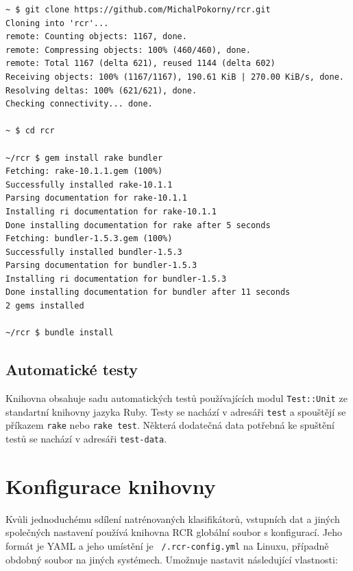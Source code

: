 \documentclass[a4paper]{article}
\begin{document}
\begin{lstlisting}
~ $ git clone https://github.com/MichalPokorny/rcr.git
Cloning into 'rcr'...
remote: Counting objects: 1167, done.
remote: Compressing objects: 100% (460/460), done.
remote: Total 1167 (delta 621), reused 1144 (delta 602)
Receiving objects: 100% (1167/1167), 190.61 KiB | 270.00 KiB/s, done.
Resolving deltas: 100% (621/621), done.
Checking connectivity... done.

~ $ cd rcr

~/rcr $ gem install rake bundler
Fetching: rake-10.1.1.gem (100%)
Successfully installed rake-10.1.1
Parsing documentation for rake-10.1.1
Installing ri documentation for rake-10.1.1
Done installing documentation for rake after 5 seconds
Fetching: bundler-1.5.3.gem (100%)
Successfully installed bundler-1.5.3
Parsing documentation for bundler-1.5.3
Installing ri documentation for bundler-1.5.3
Done installing documentation for bundler after 11 seconds
2 gems installed

~/rcr $ bundle install
\end{lstlisting}

\subsection{Automatické testy}
Knihovna obsahuje sadu automatických testů používajících modul
\texttt{Test::Unit} ze standartní knihovny jazyka Ruby.
Testy se nachází v adresáři \texttt{test} a spouštějí se příkazem
\texttt{rake} nebo \texttt{rake test}. Některá dodatečná data potřebná
ke spuštění testů se nachází v adresáři \texttt{test-data}.

\section{Konfigurace knihovny}
Kvůli jednoduchému sdílení natrénovaných klasifikátorů, vstupních dat
a jiných společných nastavení používá knihovna RCR globální soubor
s konfigurací. Jeho formát je YAML a jeho umístění je \texttt{~/.rcr-config.yml}
na Linuxu, případně obdobný soubor na jiných systémech.
Umožnuje nastavit následující vlastnosti:
\end{document}
